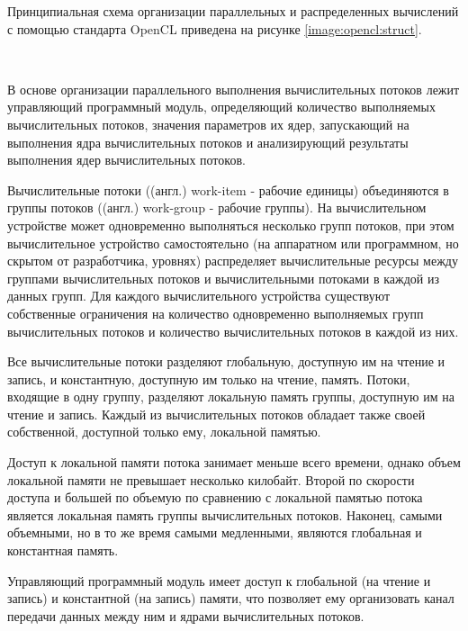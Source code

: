 Принципиальная схема организации параллельных и распределенных вычислений с помощью стандарта OpenCL приведена на рисунке \ref{image:opencl:struct}.

\begin{landscape}
~
\vfill
{}
\vfill
~
\end{landscape}

В основе организации параллельного выполнения вычислительных потоков лежит управляющий программный модуль, определяющий количество выполняемых вычислительных потоков, значения параметров их ядер, запускающий на выполнения ядра вычислительных потоков и анализирующий результаты выполнения ядер вычислительных потоков.

Вычислительные потоки ((англ.) work-item - рабочие единицы) объединяются в группы потоков ((англ.) work-group - рабочие группы). На вычислительном устройстве может одновременно выполняться несколько групп потоков, при этом вычислительное устройство самостоятельно (на аппаратном или программном, но скрытом от разработчика, уровнях) распределяет вычислительные ресурсы между группами вычислительных потоков и вычислительными потоками в каждой из данных групп. Для каждого вычислительного устройства существуют собственные ограничения на количество одновременно выполняемых групп вычислительных потоков и количество вычислительных потоков в каждой из них.

Все вычислительные потоки разделяют глобальную, доступную им на чтение и запись, и константную, доступную им только на чтение, память. Потоки, входящие в одну группу, разделяют локальную память группы, доступную им на чтение и запись. Каждый из вычислительных потоков обладает также своей собственной, доступной только ему, локальной памятью.

Доступ к локальной памяти потока занимает меньше всего времени, однако объем локальной памяти не превышает несколько килобайт. Второй по скорости доступа и большей по объемую по сравнению с локальной памятью потока является локальная память группы вычислительных потоков. Наконец, самыми объемными, но в то же время самыми медленными, являются глобальная и константная память.

Управляющий программный модуль имеет доступ к глобальной (на чтение и запись) и константной (на запись) памяти, что позволяет ему организовать канал передачи данных между ним и ядрами вычислительных потоков.

